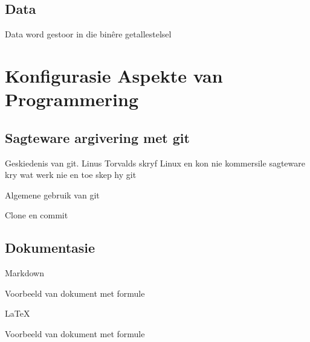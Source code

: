 \chapter[Data]
{Data}

Data word gestoor in die bin\^ere getallestelsel




\part[Konfigurasie Aspekte]
{Konfigurasie Aspekte van\\ Programmering}

\chapter[git]
{Sagteware argivering met git}



Geskiedenis van git. Linus Torvalds skryf Linux en kon nie kommersile sagteware kry wat werk nie en toe skep hy git

Algemene gebruik van git

Clone en commit

\chapter[Dokumentasie]
{Dokumentasie}


Markdown 

Voorbeeld van dokument met formule

LaTeX

Voorbeeld van dokument met formule

